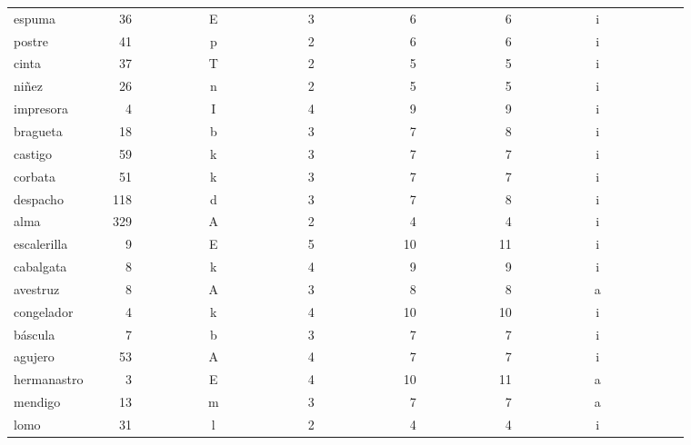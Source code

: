 \begin{longtable}{|l|c|c|c|c|c|c|}
espuma~~~~~~~&~36~~~~~~~~~~&E~~~~~~~~~~~~&3~~~~~~~~~~~~&~6~~~~~~~~~~~&~6~~~~~~~~~~~&i~~~~~~~~~~~~\\ 
postre~~~~~~~&~41~~~~~~~~~~&p~~~~~~~~~~~~&2~~~~~~~~~~~~&~6~~~~~~~~~~~&~6~~~~~~~~~~~&i~~~~~~~~~~~~\\ 
cinta~~~~~~~~&~37~~~~~~~~~~&T~~~~~~~~~~~~&2~~~~~~~~~~~~&~5~~~~~~~~~~~&~5~~~~~~~~~~~&i~~~~~~~~~~~~\\ 
ni\~{n}ez~~~~~~~~&~26~~~~~~~~~~&n~~~~~~~~~~~~&2~~~~~~~~~~~~&~5~~~~~~~~~~~&~5~~~~~~~~~~~&i~~~~~~~~~~~~\\ 
impresora~~~~&~~4~~~~~~~~~~&I~~~~~~~~~~~~&4~~~~~~~~~~~~&~9~~~~~~~~~~~&~9~~~~~~~~~~~&i~~~~~~~~~~~~\\ 
bragueta~~~~~&~18~~~~~~~~~~&b~~~~~~~~~~~~&3~~~~~~~~~~~~&~7~~~~~~~~~~~&~8~~~~~~~~~~~&i~~~~~~~~~~~~\\ 
castigo~~~~~~&~59~~~~~~~~~~&k~~~~~~~~~~~~&3~~~~~~~~~~~~&~7~~~~~~~~~~~&~7~~~~~~~~~~~&i~~~~~~~~~~~~\\ 
corbata~~~~~~&~51~~~~~~~~~~&k~~~~~~~~~~~~&3~~~~~~~~~~~~&~7~~~~~~~~~~~&~7~~~~~~~~~~~&i~~~~~~~~~~~~\\ 
despacho~~~~~&118~~~~~~~~~~&d~~~~~~~~~~~~&3~~~~~~~~~~~~&~7~~~~~~~~~~~&~8~~~~~~~~~~~&i~~~~~~~~~~~~\\ 
alma~~~~~~~~~&329~~~~~~~~~~&A~~~~~~~~~~~~&2~~~~~~~~~~~~&~4~~~~~~~~~~~&~4~~~~~~~~~~~&i~~~~~~~~~~~~\\ 
escalerilla~~&~~9~~~~~~~~~~&E~~~~~~~~~~~~&5~~~~~~~~~~~~&10~~~~~~~~~~~&11~~~~~~~~~~~&i~~~~~~~~~~~~\\ 
cabalgata~~~~&~~8~~~~~~~~~~&k~~~~~~~~~~~~&4~~~~~~~~~~~~&~9~~~~~~~~~~~&~9~~~~~~~~~~~&i~~~~~~~~~~~~\\ 
avestruz~~~~~&~~8~~~~~~~~~~&A~~~~~~~~~~~~&3~~~~~~~~~~~~&~8~~~~~~~~~~~&~8~~~~~~~~~~~&a~~~~~~~~~~~~\\ 
congelador~~~&~~4~~~~~~~~~~&k~~~~~~~~~~~~&4~~~~~~~~~~~~&10~~~~~~~~~~~&10~~~~~~~~~~~&i~~~~~~~~~~~~\\ 
b\'{a}scula~~~~~~&~~7~~~~~~~~~~&b~~~~~~~~~~~~&3~~~~~~~~~~~~&~7~~~~~~~~~~~&~7~~~~~~~~~~~&i~~~~~~~~~~~~\\ 
agujero~~~~~~&~53~~~~~~~~~~&A~~~~~~~~~~~~&4~~~~~~~~~~~~&~7~~~~~~~~~~~&~7~~~~~~~~~~~&i~~~~~~~~~~~~\\ 
hermanastro~~&~~3~~~~~~~~~~&E~~~~~~~~~~~~&4~~~~~~~~~~~~&10~~~~~~~~~~~&11~~~~~~~~~~~&a~~~~~~~~~~~~\\ 
mendigo~~~~~~&~13~~~~~~~~~~&m~~~~~~~~~~~~&3~~~~~~~~~~~~&~7~~~~~~~~~~~&~7~~~~~~~~~~~&a~~~~~~~~~~~~\\ 
lomo~~~~~~~~~&~31~~~~~~~~~~&l~~~~~~~~~~~~&2~~~~~~~~~~~~&~4~~~~~~~~~~~&~4~~~~~~~~~~~&i~~~~~~~~~~~~\\ 

\end{longtable}
